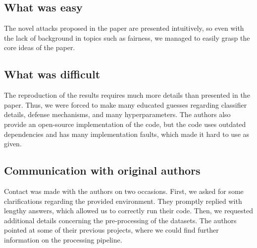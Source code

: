 \subsection*{What was easy}

The novel attacks proposed in the paper are presented intuitively, so even with the lack of background in topics such as fairness, we managed to easily grasp the core ideas of the paper. 
\subsection*{What was difficult}

The reproduction of the results requires much more details than presented in the paper. Thus, we were forced to make many educated guesses regarding classifier details, defense mechanisms, and many hyperparameters. The authors also provide an open-source implementation of the code, but the code uses outdated dependencies and has many implementation faults, which made it hard to use as given. 
\subsection*{Communication with original authors}

Contact was made with the authors on two occasions. First, we asked for some clarifications regarding the provided environment. They promptly replied with lengthy answers, which allowed us to correctly run their code. Then, we requested additional details concerning the pre-processing of the datasets. The authors pointed at some of their previous projects, where we could find further information on the processing pipeline.